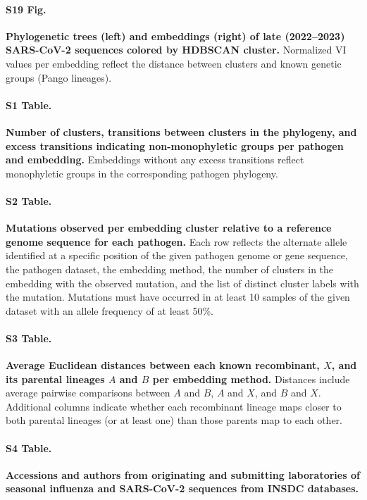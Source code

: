 \documentclass[10pt,letterpaper]{article}
\begin{document}
\paragraph*{S19 Fig.}
\label{S_Fig_sarscov2_late_embeddings_by_cluster_vs_Nextclade_pango}
{\bf Phylogenetic trees (left) and embeddings (right) of late (2022--2023) SARS-CoV-2 sequences colored by HDBSCAN cluster.}
Normalized VI values per embedding reflect the distance between clusters and known genetic groups (Pango lineages).

\paragraph*{S1 Table.}
\label{S_Table_monophyletic_clusters}
{\bf Number of clusters, transitions between clusters in the phylogeny, and excess transitions indicating non-monophyletic groups per pathogen and embedding.}
Embeddings without any excess transitions reflect monophyletic groups in the corresponding pathogen phylogeny.

\paragraph*{S2 Table.}
\label{S_Table_mutations_per_cluster}
{\bf Mutations observed per embedding cluster relative to a reference genome sequence for each pathogen.}
Each row reflects the alternate allele identified at a specific position of the given pathogen genome or gene sequence, the pathogen dataset, the embedding method, the number of clusters in the embedding with the observed mutation, and the list of distinct cluster labels with the mutation.
Mutations must have occurred in at least 10 samples of the given dataset with an allele frequency of at least 50\%.

\paragraph*{S3 Table.}
\label{S_Table_recombinant_distances}
{\bf Average Euclidean distances between each known recombinant, $X$, and its parental lineages $A$ and $B$ per embedding method.}
Distances include average pairwise comparisons between $A$ and $B$, $A$ and $X$, and $B$ and $X$.
Additional columns indicate whether each recombinant lineage maps closer to both parental lineages (or at least one) than those parents map to each other.

\paragraph*{S4 Table.}
\label{S_Table_accessions}
{\bf Accessions and authors from originating and submitting laboratories of seasonal influenza and SARS-CoV-2 sequences from INSDC databases.}
\end{document}
